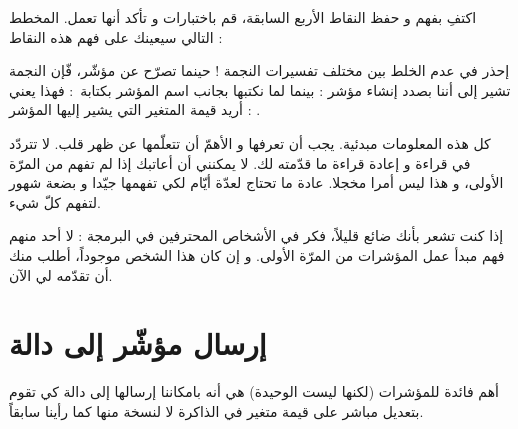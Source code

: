 اكتفِ بفهم و حفظ النقاط الأربع السابقة، قم باختبارات و تأكد أنها تعمل. المخطط التالي سيعينك على فهم هذه النقاط :


\begin{warning}
إحذر في عدم الخلط بين مختلف تفسيرات النجمة ! حينما تصرّح عن مؤشّر، فّإن النجمة تشير إلى أننا بصدد إنشاء مؤشر :
بينما لما نكتبها بجانب اسم المؤشر بكتابة~:
فهذا يعني : أريد قيمة المتغير التي يشير إليها المؤشر
.
\end{warning}

كل هذه المعلومات مبدئية. يجب أن تعرفها و الأهمّ أن تتعلّمها عن ظهر قلب. لا تتردّد في قراءة و إعادة قراءة ما قدّمته لك. لا يمكنني أن أعاتبك إذا لم تفهم من المرّة الأولى، و هذا ليس أمرا مخجلا. عادة ما تحتاج لعدّة أيّام لكي تفهمها جيّدا و بضعة شهور لتفهم كلّ شيء.

إذا كنت تشعر بأنك ضائع قليلاً، فكر في الأشخاص المحترفين في البرمجة : لا أحد منهم فهم مبدأ عمل المؤشرات من المرّة الأولى. و إن كان هذا الشخص موجوداً، أطلب منك أن تقدّمه لي الآن.

\section{إرسال مؤشّر إلى دالة}
أهم فائدة للمؤشرات (لكنها ليست الوحيدة) هي أنه بامكاننا إرسالها إلى دالة كي تقوم بتعديل مباشر على قيمة متغير في الذاكرة لا لنسخة منها كما رأينا سابقاً.


